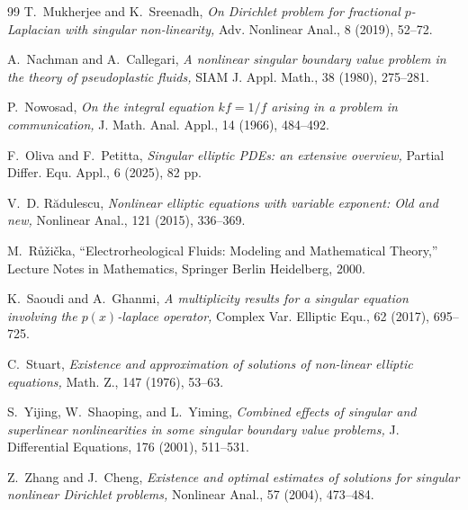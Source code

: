 \documentclass[11pt]{article}
\begin{document}
\begin{thebibliography}{99}
T.~Mukherjee and K.~Sreenadh,
{\it On {D}irichlet problem for fractional {$p$}-{L}aplacian with singular
  non-linearity,}
Adv. Nonlinear Anal., 8 (2019), 52--72.

A.~Nachman and A.~Callegari,
{\it A nonlinear singular boundary value problem in the theory of
  pseudoplastic fluids,}
SIAM J. Appl. Math., 38 (1980), 275--281.

P.~Nowosad,
{\it On the integral equation $kf = 1/f$
arising in a problem in
  communication,}
J. Math. Anal. Appl., 14 (1966), 484--492.

F.~Oliva and F.~Petitta,
{\it Singular elliptic {PDE}s: an extensive overview,}
Partial Differ. Equ. Appl., 6 (2025), 82 pp.

V.~D. R{\u{a}}dulescu,
{\it Nonlinear elliptic equations with variable exponent: Old and new,}
Nonlinear Anal., 121 (2015), 336--369.

M.~R\r{u}{\v z}i{\v c}ka,
``Electrorheological Fluids: Modeling and Mathematical Theory,''
 Lecture Notes in Mathematics, Springer Berlin Heidelberg, 2000.

K.~Saoudi and A.~Ghanmi,
{\it A multiplicity results for a singular equation involving the
  $p(x)$-laplace operator,}
Complex Var. Elliptic Equ., 62 (2017), 695--725.

C.~Stuart,
{\it Existence and approximation of solutions of non-linear elliptic
  equations,}
Math. Z., 147 (1976), 53--63.

S.~Yijing, W.~Shaoping, and L.~Yiming,
{\it Combined effects of singular and superlinear nonlinearities in some
  singular boundary value problems,}
J. Differential Equations, 176 (2001), 511--531.

Z.~Zhang and J.~Cheng,
{\it Existence and optimal estimates of solutions for singular nonlinear
  {D}irichlet problems,}
Nonlinear Anal., 57 (2004), 473--484.

\end{thebibliography}
\end{document}
